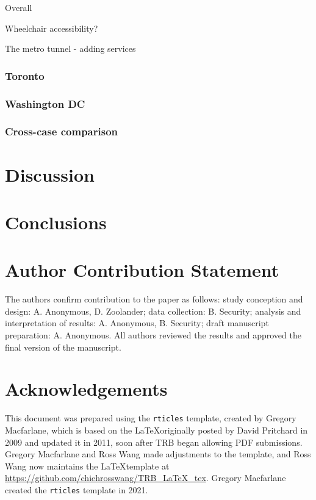 \documentclass[numbered]{trbunofficial}
\begin{document}
Overall

Wheelchair accessibility?

The metro tunnel - adding services

\hypertarget{toronto}{%
\subsubsection{Toronto}\label{toronto}}

\hypertarget{washington-dc}{%
\subsubsection{Washington DC}\label{washington-dc}}

\hypertarget{cross-case-comparison}{%
\subsubsection{Cross-case comparison}\label{cross-case-comparison}}

\hypertarget{discussion}{%
\section{Discussion}\label{discussion}}

\hypertarget{conclusions}{%
\section{Conclusions}\label{conclusions}}

\hypertarget{author-contribution-statement}{%
\section{Author Contribution
Statement}\label{author-contribution-statement}}

The authors confirm contribution to the paper as follows: study
conception and design: A. Anonymous, D. Zoolander; data collection: B.
Security; analysis and interpretation of results: A. Anonymous, B.
Security; draft manuscript preparation: A. Anonymous. All authors
reviewed the results and approved the final version of the manuscript.

\hypertarget{acknowledgements}{%
\section{Acknowledgements}\label{acknowledgements}}

This document was prepared using the \texttt{rticles} template, created
by Gregory Macfarlane, which is based on the \LaTeX originally posted by
David Pritchard in 2009 and updated it in 2011, soon after TRB began
allowing PDF submissions. Gregory Macfarlane and Ross Wang made
adjustments to the template, and Ross Wang now maintains the
\LaTeX template at \url{https://github.com/chiehrosswang/TRB_LaTeX_tex}.
Gregory Macfarlane created the \texttt{rticles} template in 2021.

\newpage
\renewcommand\refname{References}

\end{document}
